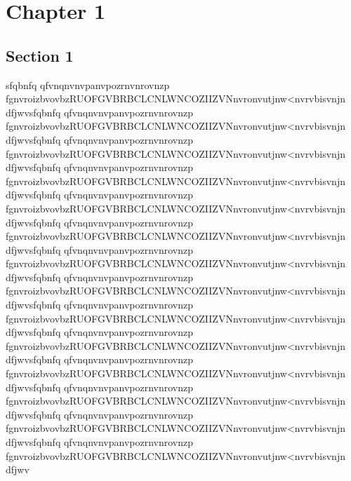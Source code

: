 \chapter{Chapter 1}
\label{chap:premierchapitre}
\minitoc


\section{Section 1}
sfqbnfq qfvnqnvnvpanvpozrnvnrovnzp fgnvroizbvovbzRUOFGVBRBCLCNLWNCOZIIZVNnvronvutjnw<nvrvbisvnjn dfjwvsfqbnfq qfvnqnvnvpanvpozrnvnrovnzp fgnvroizbvovbzRUOFGVBRBCLCNLWNCOZIIZVNnvronvutjnw<nvrvbisvnjn dfjwvsfqbnfq qfvnqnvnvpanvpozrnvnrovnzp fgnvroizbvovbzRUOFGVBRBCLCNLWNCOZIIZVNnvronvutjnw<nvrvbisvnjn dfjwvsfqbnfq qfvnqnvnvpanvpozrnvnrovnzp fgnvroizbvovbzRUOFGVBRBCLCNLWNCOZIIZVNnvronvutjnw<nvrvbisvnjn dfjwvsfqbnfq qfvnqnvnvpanvpozrnvnrovnzp fgnvroizbvovbzRUOFGVBRBCLCNLWNCOZIIZVNnvronvutjnw<nvrvbisvnjn dfjwvsfqbnfq qfvnqnvnvpanvpozrnvnrovnzp fgnvroizbvovbzRUOFGVBRBCLCNLWNCOZIIZVNnvronvutjnw<nvrvbisvnjn dfjwvsfqbnfq qfvnqnvnvpanvpozrnvnrovnzp fgnvroizbvovbzRUOFGVBRBCLCNLWNCOZIIZVNnvronvutjnw<nvrvbisvnjn dfjwvsfqbnfq qfvnqnvnvpanvpozrnvnrovnzp fgnvroizbvovbzRUOFGVBRBCLCNLWNCOZIIZVNnvronvutjnw<nvrvbisvnjn dfjwvsfqbnfq qfvnqnvnvpanvpozrnvnrovnzp fgnvroizbvovbzRUOFGVBRBCLCNLWNCOZIIZVNnvronvutjnw<nvrvbisvnjn dfjwvsfqbnfq qfvnqnvnvpanvpozrnvnrovnzp fgnvroizbvovbzRUOFGVBRBCLCNLWNCOZIIZVNnvronvutjnw<nvrvbisvnjn dfjwvsfqbnfq qfvnqnvnvpanvpozrnvnrovnzp fgnvroizbvovbzRUOFGVBRBCLCNLWNCOZIIZVNnvronvutjnw<nvrvbisvnjn dfjwvsfqbnfq qfvnqnvnvpanvpozrnvnrovnzp fgnvroizbvovbzRUOFGVBRBCLCNLWNCOZIIZVNnvronvutjnw<nvrvbisvnjn dfjwvsfqbnfq qfvnqnvnvpanvpozrnvnrovnzp fgnvroizbvovbzRUOFGVBRBCLCNLWNCOZIIZVNnvronvutjnw<nvrvbisvnjn dfjwvsfqbnfq qfvnqnvnvpanvpozrnvnrovnzp\todo{[biblio]} fgnvroizbvovbzRUOFGVBRBCLCNLWNCOZIIZVNnvronvutjnw<nvrvbisvnjn dfjwv

